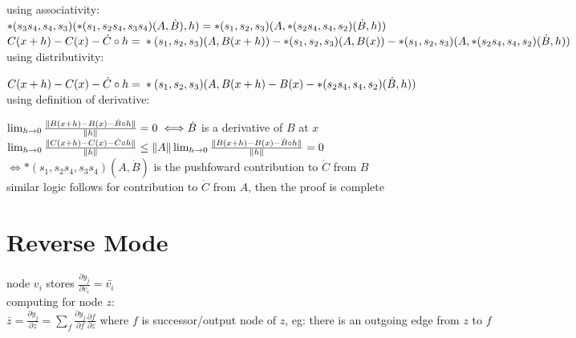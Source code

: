 \documentclass[8pt]{extarticle}
\begin{document}
\begin{multicols*}{2}
  using associativity:\\
  $*(s_3 s_4, s_4, s_3)(*(s_1, s_2 s_4, s_3 s_4)(A, \dot{B}), h)\\ = *(s_1, s_2, s_3)(A, *(s_2 s_4, s_4, s_2)(\dot{B}, h))$\\

  $C(x+h) - C(x) - \dot{C} \circ h =\\
  *(s_1, s_2, s_3)(A, B(x+h))\\
  - *(s_1, s_2, s_3)(A, B(x))\\
  - *(s_1, s_2, s_3)(A, *(s_2 s_4, s_4, s_2)(\dot{B}, h))$\\

  using distributivity:

  $C(x+h) - C(x) - \dot{C} \circ h =\\
  *(s_1, s_2, s_3)(A, B(x+h) - B(x) - *(s_2 s_4, s_4, s_2)(\dot{B}, h))$\\

  using definition of derivative:

  $\lim_{h \rightarrow 0} \frac{\| B(x+h) - B(x) - \dot{B} \circ h \|}{\|h\|} = 0 \iff \\ \dot{B}$ is a derivative of $B$ at $x$\\

  $\lim_{h \rightarrow 0} \frac{\| C(x+h) - C(x) - \dot{C} \circ h \|}{\|h\|} \\ \leq \|A\| \lim_{h \rightarrow 0} \frac{\| B(x+h) - B(x) - \dot{B} \circ h \|}{\|h\|} = 0$\\
  $\iff *(s_1, s_2 s_4, s_3 s_4)(A, \dot{B})$ is the pushfoward contribution to $\dot{C}$ from $B$\\

  similar logic follows for contribution to $\dot{C}$ from $A$, then the proof is complete
  
  \vfill\null
  \columnbreak
    
  \section{Reverse Mode}

  node $v_i$ stores $\frac{\partial y_j}{\partial v_i} = \bar{v_i}$\\

  computing for node $z$:\\
  $\bar{z} = \frac{\partial y_j}{\partial z} = \sum_f \frac{\partial y_j}{\partial f} \frac{\partial f}{\partial z}$ where $f$ is successor/output node of $z$, eg: there is an outgoing edge from $z$ to $f$\\
  

\end{multicols*}
\end{document}
